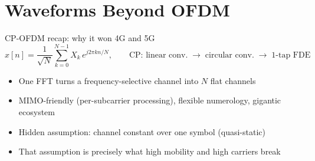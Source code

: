 \section{Waveforms Beyond OFDM}

\begin{frame}{CP-OFDM recap: why it won 4G and 5G}
  \begin{equation*}
    x[n]=\frac{1}{\sqrt N}\sum_{k=0}^{N-1}X_k\,e^{j2\pi kn/N},
    \qquad\text{CP: linear conv.}\;\to\;\text{circular conv.}\;\to\;
    \text{1-tap FDE}
  \end{equation*}
  \begin{itemize}\itemsep2pt
    \item One FFT turns a frequency-selective channel into $N$ flat channels
    \item MIMO-friendly (per-subcarrier processing), flexible numerology,
          gigantic ecosystem
    \item Hidden assumption: \alert{channel constant over one symbol}
          (quasi-static)
    \item That assumption is precisely what high mobility and high carriers
          break
  \end{itemize}
\end{frame}

